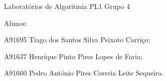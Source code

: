 Laboratórios de Algoritmia P\+L1 Grupo 4

Alunos\+:
\begin{DoxyItemize}
\item A91695 Tiago dos Santos Silva Peixoto Carriço;
\item A91637 Henrique Pinto Pires Lopes de Faria;
\item A91660 Pedro António Pires Correia Leite Sequeira. 
\end{DoxyItemize}